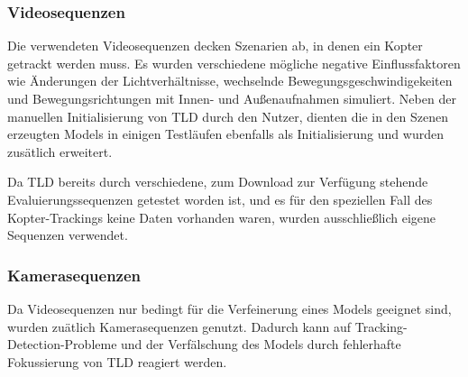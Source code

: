 \subsubsection{Videosequenzen}
Die verwendeten Videosequenzen decken Szenarien ab, in denen ein Kopter getrackt werden muss. Es wurden verschiedene mögliche negative Einflussfaktoren wie Änderungen der Lichtverhältnisse, wechselnde Bewegungsgeschwindigekeiten und Bewegungsrichtungen mit Innen- und Außenaufnahmen simuliert. Neben der manuellen Initialisierung von TLD durch den Nutzer, dienten die in den Szenen erzeugten Models in einigen Testläufen ebenfalls als Initialisierung und wurden zusätlich erweitert.

Da TLD bereits durch verschiedene, zum Download zur Verfügung stehende Evaluierungssequenzen getestet worden ist, und es für den speziellen Fall des Kopter-Trackings keine Daten vorhanden waren, wurden ausschließlich eigene Sequenzen verwendet.

\subsubsection{Kamerasequenzen}
Da Videosequenzen nur bedingt für die Verfeinerung eines Models geeignet sind, wurden zuätlich Kamerasequenzen genutzt. Dadurch kann auf Tracking-Detection-Probleme und der Verfälschung des Models durch fehlerhafte Fokussierung von TLD reagiert werden.